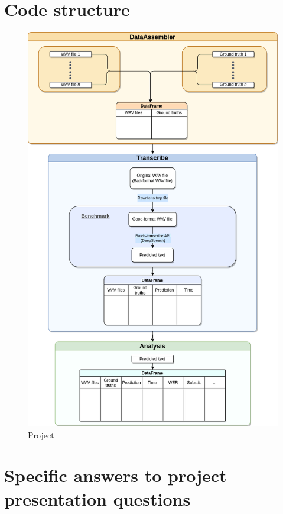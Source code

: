 \documentclass[12pt]{article}
\begin{document}
\section{Code structure}
\label{appendix: code structure}
\begin{figure}[H]
    \centering
    \includegraphics[width=\textwidth, height=0.9\textheight]{images/speech-recognition.drawio.png}
    \caption{Project }
\end{figure}

\section{Specific answers to project presentation questions}
\end{document}
